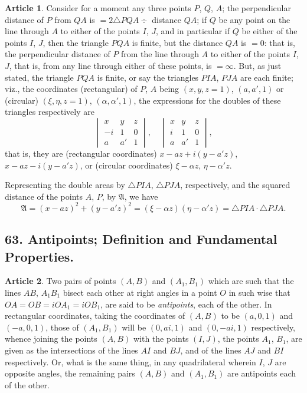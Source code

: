 \documentclass[11pt,a4paper]{article}
\theoremstyle{definition}
\newtheorem{art}{Article}
\begin{document}
\begin{art}
Consider for a moment any three points $P$, $Q$, $A$; the perpendicular distance of $P$ from $QA$ is $= 2\triangle PQA \div$ distance $QA$; if $Q$ be any point on the line through $A$ to either of the points $I$, $J$, and in particular if $Q$ be either of the points $I$, $J$, then the triangle $PQA$ is finite, but the distance $QA$ is $= 0$: that is, the perpendicular distance of $P$ from the line through $A$ to either of the points $I$, $J$, that is, from any line through either of these points, is $= \infty$. But, as just stated, the triangle $PQA$ is finite, or say the triangles $PIA$, $PJA$ are each finite; viz., the coordinates (rectangular) of $P$, $A$ being $(x, y, z = 1)$, $(a, a', 1)$ or (circular) $(\xi, \eta, z = 1)$, $(\alpha, \alpha', 1)$, the expressions for the doubles of these triangles respectively are
\[
\begin{vmatrix} x & y & z \\ -i & 1 & 0 \\ a & a' & 1 \end{vmatrix}, \quad
\begin{vmatrix} x & y & z \\ i & 1 & 0 \\ a & a' & 1 \end{vmatrix},
\]
that is, they are (rectangular coordinates) $x - az + i(y - a'z)$, $x - az - i(y - a'z)$, or (circular coordinates) $\xi - \alpha z$, $\eta - \alpha' z$.

Representing the double areas by $\triangle PIA$, $\triangle PJA$, respectively, and the squared distance of the points $A$, $P$, by $\mathfrak{A}$, we have
\[
\mathfrak{A} = (x - az)^{2} + (y - a'z)^{2} = (\xi - \alpha z)(\eta - \alpha' z) = \triangle PIA \cdot \triangle PJA.
\]
\end{art}

\subsection*{63. Antipoints; Definition and Fundamental Properties.}

\begin{art}
Two pairs of points $(A, B)$ and $(A_{1}, B_{1})$ which are such that the lines $AB$, $A_{1}B_{1}$ bisect each other at right angles in a point $O$ in such wise that $OA = OB = iOA_{1} = iOB_{1}$, are said to be \textit{antipoints}, each of the other. In rectangular coordinates, taking the coordinates of $(A, B)$ to be $(a, 0, 1)$ and $(-a, 0, 1)$, those of $(A_{1}, B_{1})$ will be $(0, ai, 1)$ and $(0, -ai, 1)$ respectively, whence joining the points $(A, B)$ with the points $(I, J)$, the points $A_{1}$, $B_{1}$, are given as the intersections of the lines $AI$ and $BJ$, and of the lines $AJ$ and $BI$ respectively. Or, what is the same thing, in any quadrilateral wherein $I$, $J$ are opposite angles, the remaining pairs $(A, B)$ and $(A_{1}, B_{1})$ are antipoints each of the other.
\end{art}
\end{document}
